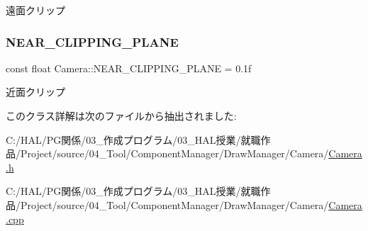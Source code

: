 遠面クリップ 

\mbox{\label{class_camera_ad2e91249b7878a87cd23cf7dd5d86e00}} 
\subsubsection{\texorpdfstring{N\+E\+A\+R\+\_\+\+C\+L\+I\+P\+P\+I\+N\+G\+\_\+\+P\+L\+A\+NE}{NEAR\_CLIPPING\_PLANE}}
{\footnotesize\ttfamily const float Camera\+::\+N\+E\+A\+R\+\_\+\+C\+L\+I\+P\+P\+I\+N\+G\+\_\+\+P\+L\+A\+NE = 0.\+1f\hspace{0.3cm}{\ttfamily [static]}}



近面クリップ 



このクラス詳解は次のファイルから抽出されました\+:\begin{DoxyCompactItemize}
\item 
C\+:/\+H\+A\+L/\+P\+G関係/03\+\_\+作成プログラム/03\+\_\+\+H\+A\+L授業/就職作品/\+Project/source/04\+\_\+\+Tool/\+Component\+Manager/\+Draw\+Manager/\+Camera/\mbox{\hyperlink{_camera_8h}{Camera.\+h}}\item 
C\+:/\+H\+A\+L/\+P\+G関係/03\+\_\+作成プログラム/03\+\_\+\+H\+A\+L授業/就職作品/\+Project/source/04\+\_\+\+Tool/\+Component\+Manager/\+Draw\+Manager/\+Camera/\mbox{\hyperlink{_camera_8cpp}{Camera.\+cpp}}\end{DoxyCompactItemize}
